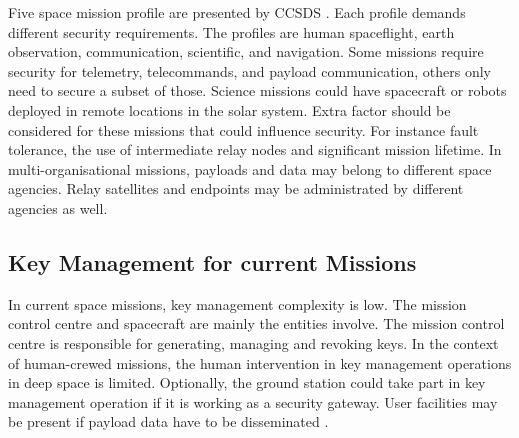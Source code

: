  Five space mission profile are presented by CCSDS \cite{book2012architecture}. Each profile demands different security requirements. The profiles are human spaceflight, earth observation, communication, scientific, and navigation. Some missions require security for telemetry, telecommands, and payload communication, others only need to secure a subset of those. Science missions could have spacecraft or robots deployed in remote locations in the solar system. Extra factor should be considered for these missions that could influence security. For instance fault tolerance, the use of intermediate relay nodes and significant mission lifetime.  In multi-organisational missions, payloads and data may belong to different space agencies. Relay satellites and endpoints may be administrated by different agencies as well.
 
 
 
 



\subsection{Key Management for current Missions}

In current space missions, key management complexity is low.  The mission control centre and spacecraft are mainly the entities involve. The mission control centre is responsible for generating, managing and revoking keys. In the context of human-crewed missions, the human intervention in key management operations in deep space is limited. Optionally, the ground station could take part in key management operation if it is working as a security gateway. User facilities may be present if payload data have to be disseminated \cite{book2011space}. 


